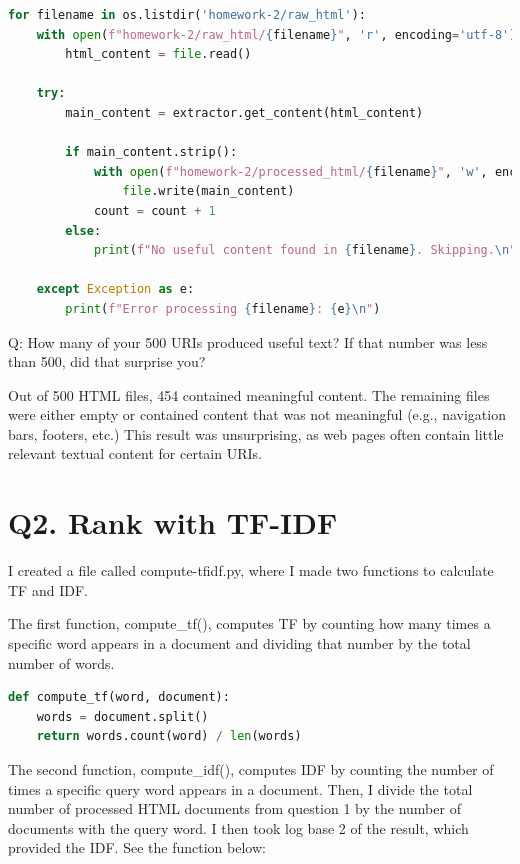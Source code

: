 \documentclass[12pt]{article}
\begin{document}
\begin{lstlisting}[language=Python, caption=process-html.py, label=lst:copy]
for filename in os.listdir('homework-2/raw_html'):
    with open(f"homework-2/raw_html/{filename}", 'r', encoding='utf-8') as file:
        html_content = file.read()

    try:
        main_content = extractor.get_content(html_content)

        if main_content.strip():
            with open(f"homework-2/processed_html/{filename}", 'w', encoding='utf-8') as file:
                file.write(main_content)
            count = count + 1
        else:
            print(f"No useful content found in {filename}. Skipping.\n")

    except Exception as e:
        print(f"Error processing {filename}: {e}\n")
\end{lstlisting}

Q: How many of your 500 URIs produced useful text? If that number was less than 500, did that surprise you?

Out of 500 HTML files, 454 contained meaningful content. The remaining files were either empty or contained content that was not meaningful (e.g., navigation bars, footers, etc.) This result was unsurprising, as web pages often contain little relevant textual content for certain URIs.

\section*{Q2. Rank with TF-IDF}

I created a file called compute-tfidf.py, where I made two functions to calculate TF and IDF. 

The first function, compute\_tf(), computes TF by counting how many times a specific word appears in a document and dividing that number by the total number of words.

\begin{lstlisting}[language=Python]
def compute_tf(word, document):
    words = document.split()
    return words.count(word) / len(words) 
\end{lstlisting}

The second function, compute\_idf(), computes IDF by counting the number of times a specific query word appears in a document. Then, I divide the total number of processed HTML documents from question 1 by the number of documents with the query word. I then took log base 2 of the result, which provided the IDF. See the function below:
\end{document}
